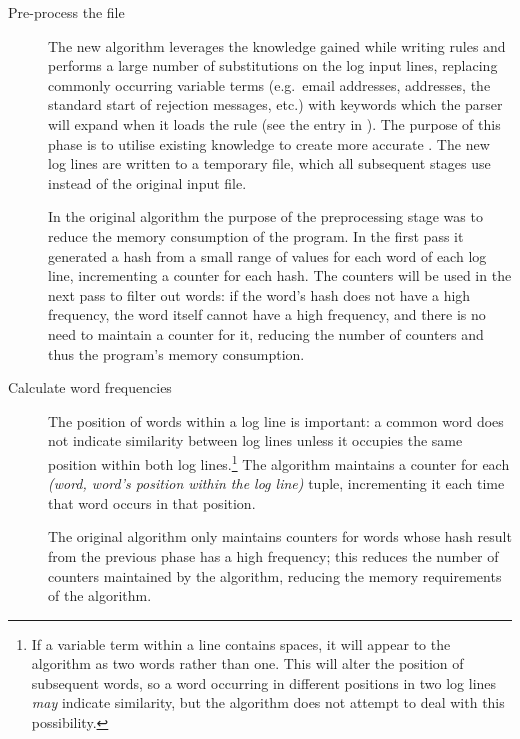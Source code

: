 \begin{description}

    \item [Pre-process the file]  The new algorithm leverages the knowledge
        gained while writing rules and performs a large number of
        substitutions on the log input lines, replacing commonly occurring
        variable terms (e.g.\ email addresses, \IP{} addresses, the
        standard start of rejection messages, etc.) with \regex{} keywords
        which the parser will expand when it loads the rule (see the
        \regex{} entry in ).  The purpose of
        this phase is to utilise existing knowledge to create more accurate
        \regexes{}.  The new log lines are written to a temporary file,
        which all subsequent stages use instead of the original input file.

        In the original algorithm the purpose of the preprocessing stage
        was to reduce the memory consumption of the program.  In the first
        pass it generated a hash from a small range of values for each word
        of each log line, incrementing a counter for each hash.  The
        counters will be used in the next pass to filter out words: if the
        word's hash does not have a high frequency, the word itself cannot
        have a high frequency, and there is no need to maintain a counter
        for it, reducing the number of counters and thus the program's
        memory consumption.

    \item [Calculate word frequencies]  The position of words within a log
        line is important: a common word does not indicate similarity
        between log lines unless it occupies the same position within both
        log lines.\footnote{If a variable term within a line contains
        spaces, it will appear to the algorithm as two words rather than
        one.  This will alter the position of subsequent words, so a word
        occurring in different positions in two log lines \textit{may\/}
        indicate similarity, but the algorithm does not attempt to deal
        with this possibility.}  The algorithm maintains a counter for each
        \textit{(word, word's position within the log line)\/} tuple,
        incrementing it each time that word occurs in that position.

        The original algorithm only maintains counters for words whose hash
        result from the previous phase has a high frequency; this reduces
        the number of counters maintained by the algorithm, reducing the
        memory requirements of the algorithm.
        

\end{description}
